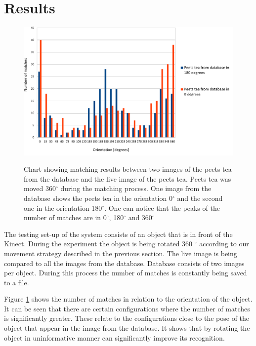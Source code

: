 \section{Results}

\begin{figure}

\includegraphics[width=1.3\columnwidth]{figures/print2.pdf}\\


\caption{Chart showing matching results between two images of the peets tea from the database and the live image of the peets tea. Peets tea was moved 360$^\circ$ during the matching process. One image from the database shows the peets tea in the orientation 0$^\circ$ and the second one in the orientation 180$^\circ$. One can notice that the peaks of the number of matches are in 0$^\circ$, 180$^\circ$ and 360$^\circ$}
\label{fig:recognition-results}
\end{figure}
The testing set-up of the system consists of an object that is in front of the Kinect. During the experiment the object is being rotated 360 $^\circ$ according to our movement strategy described in the previous section. The live image is being compared to all the images from the database. Database consists of two images per object. During this process the number of matches is constantly being saved to a file.

Figure \ref{fig:recognition-results} shows the number of matches in relation to the orientation of the object. It can be seen that there are certain configurations where the number of matches is significantly greater. These relate to the configurations close to the pose of the object that appear in the image from the database. It shows that by rotating the object in uninformative manner can significantly improve its recognition. 

